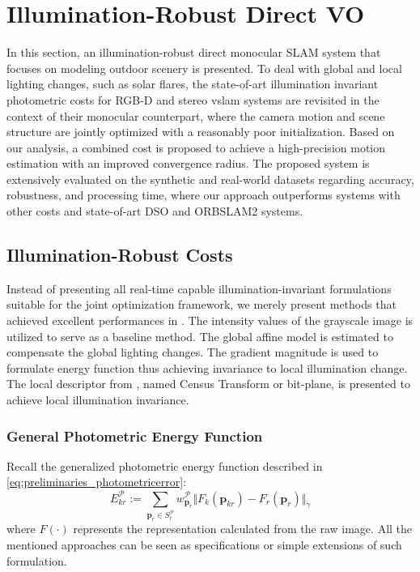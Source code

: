 \section{Illumination-Robust Direct VO}
\label{sec:illumination_direct}

In this section, an illumination-robust direct monocular SLAM system that focuses on modeling outdoor scenery is presented. 
To deal with global and local lighting changes, such as solar flares, the state-of-art illumination invariant photometric costs for RGB-D and stereo \acrshort{vslam} systems are revisited in the context of their monocular counterpart, where the camera motion and scene structure are jointly optimized with a reasonably poor initialization. 
Based on our analysis, a combined cost is proposed to achieve a high-precision motion estimation with an improved convergence radius. 
The proposed system is extensively evaluated on the synthetic and real-world datasets regarding accuracy, robustness, and processing time, where our approach outperforms systems with other costs and state-of-art DSO and ORBSLAM2 systems.

\subsection{Illumination-Robust Costs}

Instead of presenting all real-time capable illumination-invariant formulations suitable for the joint optimization framework, we merely present methods that achieved excellent performances in \cite{park2017illumination}. 
The intensity values of the grayscale image is utilized to serve as a baseline method. 
The global affine model is estimated to compensate the global lighting changes.
The gradient magnitude is used to formulate energy function thus achieving invariance to local illumination change.
The local descriptor from \cite{alismail2017direct}, named Census Transform or bit-plane, is presented to achieve local illumination invariance. 

\subsubsection{General Photometric Energy Function}

Recall the generalized photometric energy function described in \ref{eq:preliminaries_photometricerror}:
\begin{equation} \label{eq:illumination_photometric}
E_{kr}^{\mathcal{P}} := \sum_{\mathbf{p}_r \in \mathit{S}_r^{\mathcal{P}}} w_{\mathbf{p}_r}^{\mathcal{P}} \Vert F_{k} ( \mathbf{p}_{kr}) - F_{r}(\mathbf{p}_r) \Vert_{\gamma}  
\end{equation} 
where $F(\cdot)$ represents the representation calculated from the raw image.  
All the mentioned approaches can be seen as specifications or simple extensions of such formulation. 

